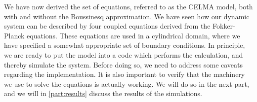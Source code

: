 We have now derived the set of equations, referred to as the CELMA model, both with and without the Boussinesq approximation.
We have seen how our dynamic system can be described by four coupled equations derived from the Fokker-Planck equations.
These equations are used in a cylindrical domain, where we have specified a somewhat appropriate set of boundary conditions.
In principle, we are ready to put the model into a code which performs the calculation, and thereby simulate the system.
Before doing so, we need to address some caveats regarding the implementation.
It is also important to verify that the machinery we use to solve the equations is actually working.
We will do so in the next part, and we will in \cref{part:results} discuss the results of the simulations.
